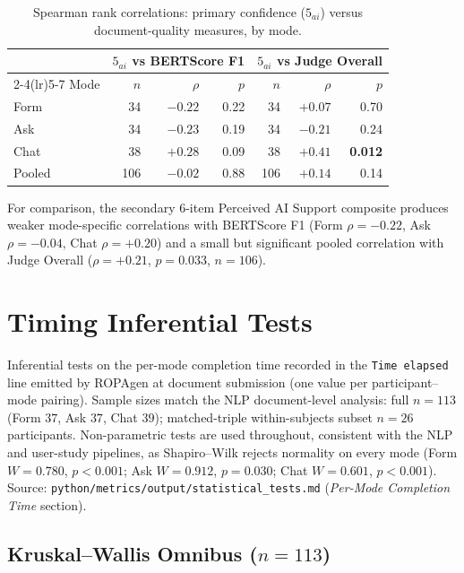 \begin{table}[htbp]
\centering
\caption{Spearman rank correlations: primary confidence ($5_{ai}$) versus
document-quality measures, by mode.}
\label{tab:app-corr-primary}
\small
\begin{tabular}{@{}l r r r r r r@{}}
\toprule
& \multicolumn{3}{c}{$5_{ai}$ vs BERTScore F1} & \multicolumn{3}{c}{$5_{ai}$ vs Judge Overall} \\
\cmidrule(lr){2-4}\cmidrule(lr){5-7}
Mode  & $n$ & $\rho$ & $p$ & $n$ & $\rho$ & $p$ \\
\midrule
Form  & 34 & $-0.22$ & 0.22 & 34 & $+0.07$ & 0.70 \\
Ask   & 34 & $-0.23$ & 0.19 & 34 & $-0.21$ & 0.24 \\
Chat  & 38 & $+0.28$ & 0.09 & 38 & $+0.41$ & \textbf{0.012} \\
Pooled & 106 & $-0.02$ & 0.88 & 106 & $+0.14$ & 0.14 \\
\bottomrule
\end{tabular}
\end{table}

For comparison, the secondary 6-item Perceived AI Support composite produces
weaker mode-specific correlations with BERTScore F1 (Form $\rho = -0.22$,
Ask $\rho = -0.04$, Chat $\rho = +0.20$) and a small but significant pooled
correlation with Judge Overall ($\rho = +0.21$, $p = 0.033$, $n = 106$).

\section{Timing Inferential Tests}
\label{app:inf-timing}

Inferential tests on the per-mode completion time recorded in the
\texttt{Time elapsed} line emitted by ROPAgen at document submission
(one value per participant--mode pairing). Sample sizes match the NLP
document-level analysis: full $n = 113$ (Form $37$, Ask $37$, Chat
$39$); matched-triple within-subjects subset $n = 26$ participants.
Non-parametric tests are used throughout, consistent with the NLP and
user-study pipelines, as Shapiro--Wilk rejects normality on every
mode (Form $W = 0.780$, $p < 0.001$; Ask $W = 0.912$, $p = 0.030$;
Chat $W = 0.601$, $p < 0.001$). Source:
\texttt{python/\allowbreak{}metrics/\allowbreak{}output/\allowbreak{}statistical\_tests.md}
(\emph{Per-Mode Completion Time} section).

\subsection{Kruskal--Wallis Omnibus ($n = 113$)}


